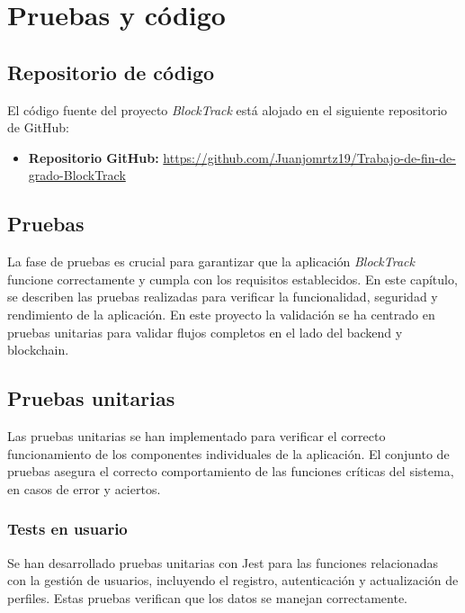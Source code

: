 \raggedbottom
\chapter{Pruebas y código}

\section{Repositorio de código}
El código fuente del proyecto \textit{BlockTrack} está alojado en el siguiente repositorio de GitHub:
\begin{itemize}
    \item \textbf{Repositorio GitHub:} \url{https://github.com/Juanjomrtz19/Trabajo-de-fin-de-grado-BlockTrack}
\end{itemize}
\section{Pruebas}
La fase de pruebas es crucial para garantizar que la aplicación \textit{BlockTrack} funcione correctamente y cumpla
con los requisitos establecidos. En este capítulo, se describen las pruebas realizadas para verificar la funcionalidad,
seguridad y rendimiento de la aplicación. En este proyecto la validación se ha centrado en pruebas unitarias para
validar flujos completos en el lado del backend y blockchain.\\

\section{Pruebas unitarias}
Las pruebas unitarias se han implementado para verificar el correcto funcionamiento de los componentes individuales
de la aplicación. El conjunto de pruebas asegura el correcto comportamiento de las funciones críticas del sistema,
en casos de error y aciertos.\\

\subsection{Tests en usuario}
Se han desarrollado pruebas unitarias con Jest para las funciones relacionadas con la gestión de usuarios, incluyendo
el registro, autenticación y actualización de perfiles. Estas pruebas verifican que los datos se manejan correctamente.

